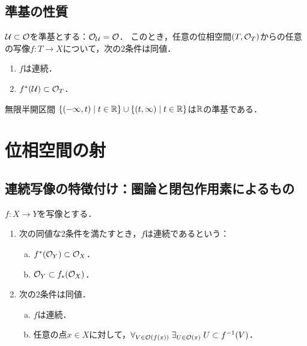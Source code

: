 \documentclass[uplatex,dvipdfmx]{jsreport}
\begin{document}
\subsection{準基の性質}

\begin{proposition}
    $\mathcal{U}\subset\mathcal{O}$を準基とする：$\mathcal{O}_{\mathcal{U}}=\mathcal{O}$．
    このとき，任意の位相空間$(T,\mathcal{O}_T)$からの任意の写像$f:T\to X$について，次の2条件は同値．
    \begin{enumerate}
        \item $f$は連続．
        \item $f^*(\mathcal{U})\subset\mathcal{O}_T$．
    \end{enumerate}
\end{proposition}

\begin{example}[実数の位相]\label{exp-subbasis-of-R}
    無限半開区間
    $\left\{(-\infty,t)\mid t\in\mathbb{R}\right\}\cup\left\{(t,\infty)\mid t\in\mathbb{R}\right\}$は$\mathbb{R}$の準基である．
\end{example}

\section{位相空間の射}

\subsection{連続写像の特徴付け：圏論と閉包作用素によるもの}

\begin{proposition}
    $f:X\to Y$を写像とする．
    \begin{enumerate}
        \item 次の同値な2条件を満たすとき，$f$は連続であるという：
        \begin{enumerate}[(a)]
            \item $f^*(\mathcal{O}_Y)\subset\mathcal{O}_X$．
            \item $\mathcal{O}_Y\subset f_*(\mathcal{O}_X)$．
        \end{enumerate}
        \item 次の2条件は同値．
        \begin{enumerate}[(a)]
            \item $f$は連続．
            \item 任意の点$x\in X$に対して，$\forall_{V\in\mathcal{O}(f(x))}\;\exists_{U\in\mathcal{O}(x)}\;U\subset f^{-1}(V)$．
        \end{enumerate}
    \end{enumerate}
\end{proposition}
\end{document}
